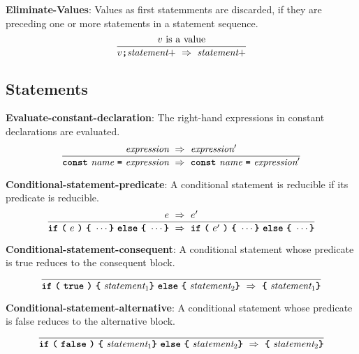 \vspace{10mm}
\textbf{Eliminate-Values}: Values as first statemments are discarded, if
they are preceding one or more statements in a statement sequence.
\[
\frac{
v \ \mbox{is a value}  
}{
v \textbf{\texttt{;}} \textit{statement}+\ 
   \Rightarrow  \ 
  \textit{statement}+
}
\]

\subsection*{Statements}

\textbf{Evaluate-constant-declaration}: The right-hand expressions
in constant declarations are evaluated.
\[
\frac{
  \textit{expression}
  \ \Rightarrow \ 
  \textit{expression}'
}{
  \textbf{\texttt{const}}\  \textit{name} \ 
  \textbf{\texttt{=}}\  \textit{expression} \ 
  \Rightarrow \ 
  \textbf{\texttt{const}}\  \textit{name} \ 
  \textbf{\texttt{=}}\  \textit{expression}'
}
\]


\vspace{10mm}

\textbf{Conditional-statement-predicate}: A conditional statement
is reducible if its predicate is reducible.
\[
\frac{
  e\ \Rightarrow\ e'
}{  
  \textbf{\texttt{if}}\ 
  \textbf{\texttt{(}}\ 
  e \ 
  \textbf{\texttt{)}} \ 
  \textbf{\texttt{\{}} \
  \cdots  
  \textbf{\texttt{\}}} \ 
  \textbf{\texttt{else}} \ 
  \textbf{\texttt{\{}} \
  \cdots  
  \textbf{\texttt{\}}}
\ 
  \Rightarrow \ 
  \textbf{\texttt{if}}\ 
  \textbf{\texttt{(}}\ 
  e' \ 
  \textbf{\texttt{)}} \ 
  \textbf{\texttt{\{}} \
  \cdots  
  \textbf{\texttt{\}}} \ 
  \textbf{\texttt{else}} \ 
  \textbf{\texttt{\{}} \
  \cdots  
  \textbf{\texttt{\}}}
}
\]

\vspace{10mm}

\textbf{Conditional-statement-consequent}: A conditional statement
whose predicate is true reduces to the consequent block.
\[
\frac{
}{  
  \textbf{\texttt{if}}\ 
  \textbf{\texttt{(}}\ 
  \textbf{\texttt{true}} \ 
  \textbf{\texttt{)}} \ 
  \textbf{\texttt{\{}} \
  \textit{statement}_1
  \textbf{\texttt{\}}} \ 
  \textbf{\texttt{else}} \ 
  \textbf{\texttt{\{}} \
\textit{statement}_2  
  \textbf{\texttt{\}}}
  \ 
  \Rightarrow  \ 
  \textbf{\texttt{\{}} \
  \textit{statement}_1  
  \textbf{\texttt{\}}}
}
\]

\textbf{Conditional-statement-alternative}: A conditional statement
whose predicate is false reduces to the alternative block.
\[
\frac{
}{  
  \textbf{\texttt{if}}\ 
  \textbf{\texttt{(}}\ 
  \textbf{\texttt{false}} \ 
  \textbf{\texttt{)}} \ 
  \textbf{\texttt{\{}} \
  \textit{statement}_1
  \textbf{\texttt{\}}} \ 
  \textbf{\texttt{else}} \ 
  \textbf{\texttt{\{}} \
\textit{statement}_2  
  \textbf{\texttt{\}}}
\ \Rightarrow \ 
  \textbf{\texttt{\{}} \
  \textit{statement}_2 
  \textbf{\texttt{\}}}
}
\]


